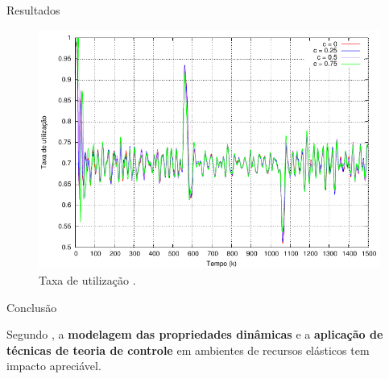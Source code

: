 \begin{frame}{Resultados}
	
	\begin{figure}
		\center
		\includegraphics[scale=0.65]{images/resposta-nobile.pdf}
		\caption{Taxa de utilização \cite{Nobile2013}.}
		\label{fig:taxa-nobile}
	\end{figure}
	
\end{frame}

\begin{frame}{Conclusão}
	
	Segundo \cite{Nobile2013}, a \textbf{modelagem das propriedades dinâmicas} e a \textbf{aplicação de técnicas de teoria de controle} em ambientes de recursos elásticos tem impacto apreciável.
	
\end{frame}